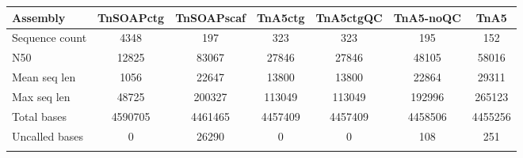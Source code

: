 \documentclass{bioinfo}
\begin{document}

\begin{table}[!t]
{\begin{tabular}{l|cccccc}\toprule
Assembly        & TnSOAPctg & TnSOAPscaf  & TnA5ctg   & TnA5ctgQC & TnA5-noQC & TnA5    \\\midrule
Sequence count  & 4348      & 197         &  323      & 323       & 195       & 152     \\
N50             & 12825     & 83067       &  27846    & 27846     & 48105     & 58016   \\
Mean seq len    & 1056      & 22647       &  13800    & 13800     & 22864     & 29311   \\
Max seq len     & 48725     & 200327      &  113049   & 113049    & 192996    & 265123  \\
Total bases     & 4590705   & 4461465     &  4457409  & 4457409   & 4458506   & 4455256 \\
Uncalled bases  & 0         & 26290       &  0        & 0         & 108       & 251     \\
\botrule \\
\end{tabular}}{}
\end{table}
\end{document}
